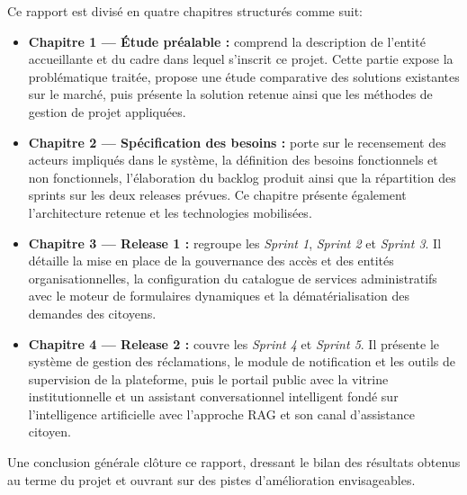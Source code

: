 Ce rapport est divisé en quatre chapitres structurés comme suit:

\begin{itemize}

    \item \textbf{Chapitre 1 — Étude préalable :} comprend la description de l'entité accueillante et du cadre dans lequel s'inscrit ce projet. Cette partie expose la problématique traitée, propose une étude comparative des solutions existantes sur le marché, puis présente la solution retenue ainsi que les méthodes de gestion de projet appliquées. 

    \item \textbf{Chapitre 2 — Spécification des besoins :} porte sur le recensement des acteurs impliqués dans le système, la définition des besoins fonctionnels et non fonctionnels, l'élaboration du backlog produit ainsi que la répartition des sprints sur les deux releases prévues. Ce chapitre présente également l'architecture retenue et les technologies mobilisées. 

    \item \textbf{Chapitre 3 — Release 1 :} regroupe les \textit{Sprint 1}, \textit{Sprint 2} et \textit{Sprint 3}. Il détaille la mise en place de la gouvernance des accès et des entités organisationnelles, la configuration du catalogue de services administratifs avec le moteur de formulaires dynamiques et la dématérialisation des demandes des citoyens.

    \item \textbf{Chapitre 4 — Release 2 :} couvre les \textit{Sprint 4} et \textit{Sprint 5}. Il présente le système de gestion des réclamations, le module de notification et les outils de supervision de la plateforme, puis le portail public avec la vitrine institutionnelle et un assistant conversationnel intelligent fondé sur l'intelligence artificielle avec l'approche RAG et son canal d'assistance citoyen.

\end{itemize}

Une conclusion générale clôture ce rapport, dressant le bilan des résultats obtenus au terme du projet et ouvrant sur des pistes d'amélioration envisageables. 